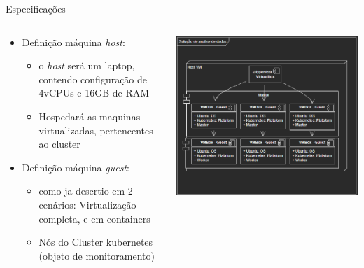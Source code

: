 \documentclass[10pt,brazil]{beamer}
\theoremstyle{definition}
\begin{document}
\begin{frame}[allowframebreaks]{Especificações}
  \framebreak
  
  \begin{columns}
    \begin{column}{0.5\textwidth}
    
      \begin{itemize}
        \item Definição máquina \emph{host}:
              \begin{itemize}
                \item o \emph{host} será um laptop, contendo configuração de 4vCPUs e 16GB de RAM
                \item Hospedará as maquinas virtualizadas, pertencentes ao cluster
                      
              \end{itemize}
        \item Definição máquina \emph{guest}:
              \begin{itemize}
                \item como ja descrtio em 2 cenários: Virtualização completa, e em containers
                \item Nós do Cluster kubernetes (objeto de monitoramento)
              \end{itemize}
      \end{itemize}
    \end{column}
    \begin{column}{0.5\textwidth}
      \includegraphics[width=1\textwidth]{SCKET.png}
    \end{column}
  \end{columns}
\end{frame}
\end{document}
